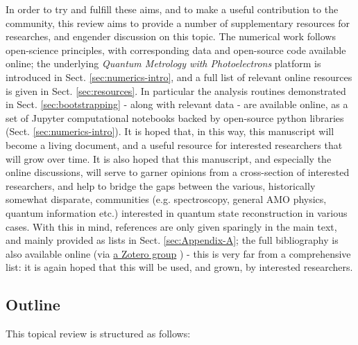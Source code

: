 In order to try and fulfill these aims, and to make a useful contribution to the community, this review aims to provide a number of supplementary resources for researches, and engender discussion on this topic. The numerical work follows open-science principles, with corresponding data and open-source code available online; the underlying \textit{Quantum Metrology with Photoelectrons} platform is introduced in Sect. \ref{sec:numerics-intro}, and a full list of relevant online resources is given in Sect. \ref{sec:resources}.
In particular the analysis routines demonstrated in Sect. \ref{sec:bootstrapping} - along with relevant data - are available online, as a set of Jupyter computational notebooks backed by open-source python libraries (Sect. \ref{sec:numerics-intro}).
It is hoped that, in this way, this manuscript will become a living document, and a useful resource for interested researchers that will grow over time. It is also hoped that this manuscript, and especially the online discussions, will serve  to garner opinions from a cross-section of interested researchers, and help to bridge the gaps between the various, historically somewhat disparate, communities (e.g. spectroscopy, general AMO physics, quantum information etc.) interested in quantum state reconstruction in various cases. With this in mind, references are only given sparingly in the main text, and mainly provided as lists in Sect. \ref{sec:Appendix-A}; the full bibliography is also available online (via \href{https://www.zotero.org/groups/4733878/molecular_frame_pads_measurements_and_reconstruction}{a Zotero group} \cite{hockettZoteroGroupsMolecular}) - this is very far from a comprehensive list: it is again hoped that this will be used, and grown, by interested researchers.

\subsection{Outline}

This topical review is structured as follows:

